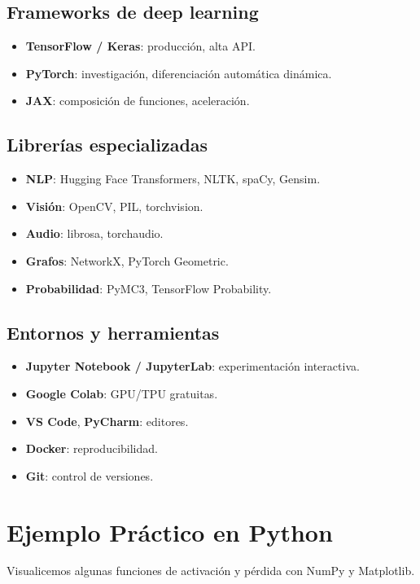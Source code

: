 \documentclass[12pt,a4paper,openany,oneside]{book}
\begin{document}
\subsection{Frameworks de deep learning}
\begin{itemize}
    \item \textbf{TensorFlow / Keras}: producción, alta API.
    \item \textbf{PyTorch}: investigación, diferenciación automática dinámica.
    \item \textbf{JAX}: composición de funciones, aceleración.
\end{itemize}

\subsection{Librerías especializadas}
\begin{itemize}
    \item \textbf{NLP}: Hugging Face Transformers, NLTK, spaCy, Gensim.
    \item \textbf{Visión}: OpenCV, PIL, torchvision.
    \item \textbf{Audio}: librosa, torchaudio.
    \item \textbf{Grafos}: NetworkX, PyTorch Geometric.
    \item \textbf{Probabilidad}: PyMC3, TensorFlow Probability.
\end{itemize}

\subsection{Entornos y herramientas}
\begin{itemize}
    \item \textbf{Jupyter Notebook / JupyterLab}: experimentación interactiva.
    \item \textbf{Google Colab}: GPU/TPU gratuitas.
    \item \textbf{VS Code}, \textbf{PyCharm}: editores.
    \item \textbf{Docker}: reproducibilidad.
    \item \textbf{Git}: control de versiones.
\end{itemize}

\section{Ejemplo Práctico en Python}
Visualicemos algunas funciones de activación y pérdida con NumPy y Matplotlib.
\end{document}
